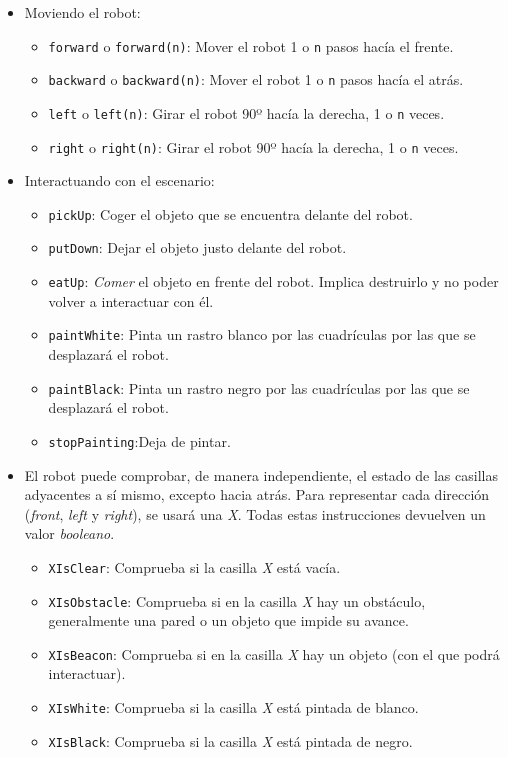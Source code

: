 \begin{itemize}
\item Moviendo el robot:
	\begin{itemize}
	\item  \texttt{forward} o \texttt{forward(n)}: Mover el robot 1 o \texttt{n} pasos hacía el frente.
	\item \texttt{backward} o \texttt{backward(n)}: Mover el robot 1 o \texttt{n} pasos hacía el atrás.
	\item \texttt{left} o \texttt{left(n)}: Girar el robot 90º hacía la derecha, 1 o \texttt{n} veces.
	\item \texttt{right} o \texttt{right(n)}: Girar el robot 90º hacía la derecha, 1 o \texttt{n} veces.
	\end{itemize}
\item Interactuando con el escenario:
	\begin{itemize}
		\item \texttt{pickUp}: Coger el objeto que se encuentra delante del robot.
		\item \texttt{putDown}: Dejar el objeto justo delante del robot.
		\item  \texttt{eatUp}: \emph{Comer} el objeto en frente del robot. Implica destruirlo y no poder volver a interactuar con él.
		\item \texttt{paintWhite}:  Pinta un rastro blanco por las cuadrículas por las que se desplazará el robot.
		\item \texttt{paintBlack}: Pinta un rastro negro por las cuadrículas por las que se desplazará el robot.
		\item  \texttt{stopPainting}:Deja de pintar.
	\end{itemize}	
\item El robot puede comprobar, de manera independiente, el estado de las casillas adyacentes a sí mismo, excepto hacia atrás. Para representar cada dirección (\emph{front}, \emph{left} y \emph{right}), se usará una \emph{X}. Todas estas instrucciones devuelven un valor \emph{booleano}.
	\begin{itemize}
		\item \texttt{XIsClear}:  Comprueba si la casilla \emph{X} está vacía.
		\item \texttt{XIsObstacle}:  Comprueba si en la casilla \emph{X} hay un obstáculo, generalmente una pared o un objeto que impide su avance.
		\item \texttt{XIsBeacon}:  Comprueba si en la casilla \emph{X} hay un objeto (con el que podrá interactuar).
		\item \texttt{XIsWhite}:  Comprueba si la casilla \emph{X} está pintada de blanco.
		\item \texttt{XIsBlack}:  Comprueba si la casilla \emph{X} está pintada de negro.
	\end{itemize}	
\end{itemize}


